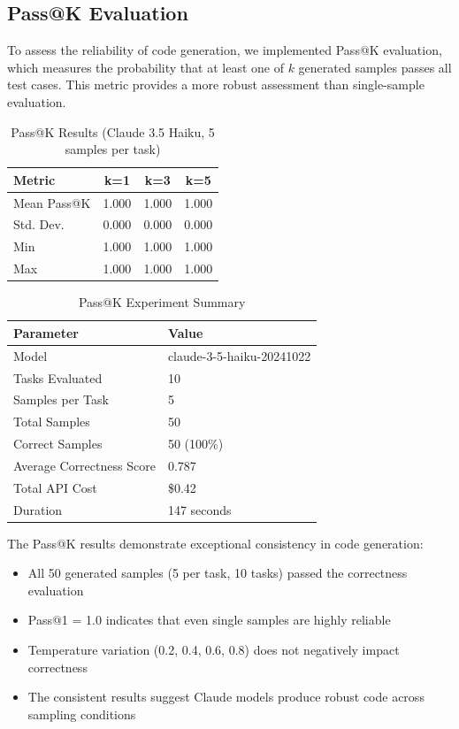 \documentclass[12pt,a4paper]{article}
\begin{document}
\subsection{Pass@K Evaluation}

To assess the reliability of code generation, we implemented Pass@K evaluation, which measures the probability that at least one of $k$ generated samples passes all test cases. This metric provides a more robust assessment than single-sample evaluation.

\begin{table}[H]
\centering
\caption{Pass@K Results (Claude 3.5 Haiku, 5 samples per task)}
\begin{tabular}{lccc}
\toprule
\textbf{Metric} & \textbf{k=1} & \textbf{k=3} & \textbf{k=5} \\
\midrule
Mean Pass@K & 1.000 & 1.000 & 1.000 \\
Std. Dev. & 0.000 & 0.000 & 0.000 \\
Min & 1.000 & 1.000 & 1.000 \\
Max & 1.000 & 1.000 & 1.000 \\
\bottomrule
\end{tabular}
\label{tab:pass_at_k}
\end{table}

\begin{table}[H]
\centering
\caption{Pass@K Experiment Summary}
\begin{tabular}{ll}
\toprule
\textbf{Parameter} & \textbf{Value} \\
\midrule
Model & claude-3-5-haiku-20241022 \\
Tasks Evaluated & 10 \\
Samples per Task & 5 \\
Total Samples & 50 \\
Correct Samples & 50 (100\%) \\
Average Correctness Score & 0.787 \\
Total API Cost & \$0.42 \\
Duration & 147 seconds \\
\bottomrule
\end{tabular}
\label{tab:pass_at_k_summary}
\end{table}

The Pass@K results demonstrate exceptional consistency in code generation:
\begin{itemize}
    \item All 50 generated samples (5 per task, 10 tasks) passed the correctness evaluation
    \item Pass@1 = 1.0 indicates that even single samples are highly reliable
    \item Temperature variation (0.2, 0.4, 0.6, 0.8) does not negatively impact correctness
    \item The consistent results suggest Claude models produce robust code across sampling conditions
\end{itemize}
\end{document}
